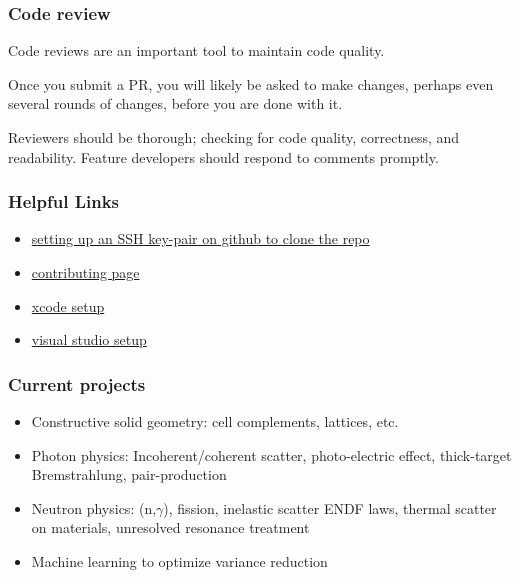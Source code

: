 \documentclass{beamer}
\begin{document}
\begin{frame}
\frametitle{Code review}

Code reviews are an important tool to maintain code quality. 

\vspace{0.4cm}

Once you submit a PR, you will likely be asked to make changes,
perhaps even several rounds of changes, before you are done with it.

\vspace{0.4cm}

Reviewers should be thorough; checking for code quality, correctness, 
and readability. 
Feature developers should respond to comments promptly.

\end{frame}

\begin{frame}[t]
\frametitle{Helpful Links}
\begin{itemize}
  \item
    \href{https://docs.github.com/en/github/authenticating-to-github/connecting-to-github-with-ssh/generating-a-new-ssh-key-and-adding-it-to-the-ssh-agent}{setting up an SSH key-pair on github to clone the repo}
  \item
  \href{https://github.com/umcpt/mc-hammer-2/blob/develop/CONTRIBUTING.md}{contributing page}
  \item
    \href{https://github.com/umcpt/mc-hammer-2/tree/develop/docs/xcode.md}{xcode setup}
  \item
    \href{https://github.com/umcpt/mc-hammer-2/tree/develop/docs/visual-studio.md}{visual studio setup}
\end{itemize}
  
\end{frame}

\begin{frame}[t]
\frametitle{Current projects}
\begin{itemize}
  \item
    Constructive solid geometry: cell complements, lattices, etc.
  \item
    Photon physics: Incoherent/coherent scatter, photo-electric effect, thick-target Bremstrahlung, pair-production
  \item 
    Neutron physics: (n,$\gamma$), fission, inelastic scatter ENDF laws, thermal scatter on materials, unresolved resonance treatment
  \item
    Machine learning to optimize variance reduction 
\end{itemize}
  
\end{frame}
\end{document}
